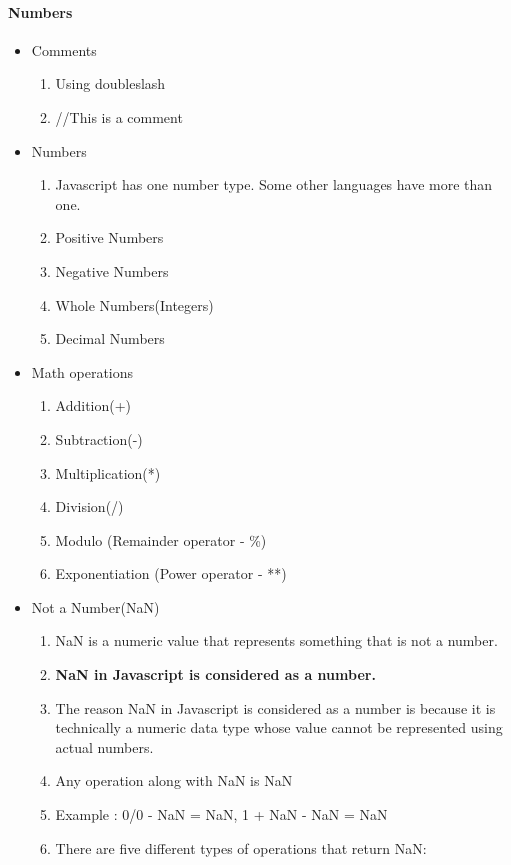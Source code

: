 \documentclass[
  paper=a4,
  ,captions=tableheading
]{scrartcl}
\providecommand{\tightlist}{%
  \setlength{\itemsep}{0pt}\setlength{\parskip}{0pt}}
\begin{document}
\hypertarget{numbers}{%
\paragraph{Numbers}\label{numbers}}

\begin{itemize}
\tightlist
\item
  Comments

  \begin{enumerate}
  \def\labelenumi{\arabic{enumi}.}
  \tightlist
  \item
    Using doubleslash
  \item
    //This is a comment
  \end{enumerate}
\item
  Numbers

  \begin{enumerate}
  \def\labelenumi{\arabic{enumi}.}
  \tightlist
  \item
    Javascript has one number type. Some other languages have more than
    one.
  \item
    Positive Numbers
  \item
    Negative Numbers
  \item
    Whole Numbers(Integers)
  \item
    Decimal Numbers
  \end{enumerate}
\item
  Math operations

  \begin{enumerate}
  \def\labelenumi{\arabic{enumi}.}
  \tightlist
  \item
    Addition(+)
  \item
    Subtraction(-)
  \item
    Multiplication(*)
  \item
    Division(/)
  \item
    Modulo (Remainder operator - \%)
  \item
    Exponentiation (Power operator - **)
  \end{enumerate}
\item
  Not a Number(NaN)

  \begin{enumerate}
  \def\labelenumi{\arabic{enumi}.}
  \tightlist
  \item
    NaN is a numeric value that represents something that is not a
    number.
  \item
    \textbf{NaN in Javascript is considered as a number.}
  \item
    The reason NaN in Javascript is considered as a number is because it
    is technically a numeric data type whose value cannot be represented
    using actual numbers.
  \item
    Any operation along with NaN is NaN
  \item
    Example : 0/0 - NaN = NaN, 1 + NaN - NaN = NaN
  \item
    There are five different types of operations that return NaN:


\end{enumerate}
\end{itemize}
\end{document}
